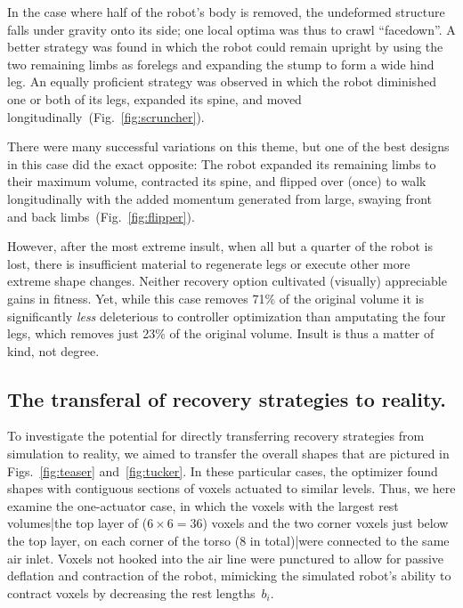 

In the case where half of the robot's body is removed, the undeformed structure falls under gravity onto its side; one local optima was thus to crawl ``facedown''.
A better strategy was found in which the robot could remain upright by using the two remaining limbs as forelegs and expanding the stump to form a wide hind leg.
An equally proficient strategy was observed in which the robot diminished one or both of its legs, expanded its spine, and moved longitudinally~(Fig.~\ref{fig:scruncher}).




There were many successful variations on this theme,
but one of the best designs in this case did the exact opposite: The robot expanded its remaining limbs to their maximum volume, contracted its spine, and flipped over (once) to walk longitudinally with the added momentum generated from large, swaying front and back limbs~(Fig.~\ref{fig:flipper}).




However, after the most extreme insult, when all but a quarter of the robot is lost, there is insufficient material to regenerate legs or execute other more extreme shape changes. 
Neither recovery option cultivated (visually) appreciable gains in fitness.
Yet, while this case removes 71\% of the original volume it is significantly \textit{less} deleterious to controller optimization than amputating the four legs, which removes just 23\% of the original volume.
Insult is thus a matter of kind, not degree.


\subsection{The transferal of recovery strategies to reality.}


To investigate the potential for directly transferring recovery strategies from simulation to reality, we aimed to transfer the overall shapes that are pictured in Figs.~\ref{fig:teaser} and~\ref{fig:tucker}. 
In these particular cases, the optimizer found shapes with contiguous sections of voxels actuated to similar levels. 
Thus, we here examine the one-actuator case, in which the voxels with the largest rest volumes|the top layer of ($6\times6=36$) voxels and the two corner voxels just below the top layer, on each corner of the torso (8 in total)|were connected to the same air inlet. 
Voxels not hooked into the air line were punctured to allow for passive deflation and contraction of the robot, mimicking the simulated robot's ability to contract voxels by decreasing the rest lengths~$b_i$. 



